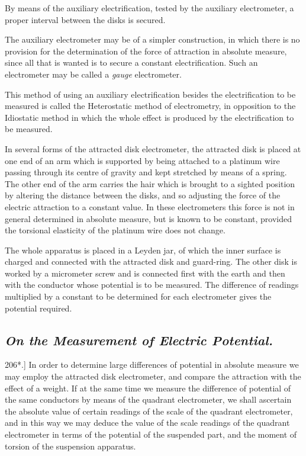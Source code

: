 \documentclass[12pt,oneside]{book}[2021/10/04]
\newcommand{\Heading}{\centering\normalfont}
\newcommand{\Subsection}[1]{\subsection*{\normalsize\Heading\itshape #1}}
\newcommand{\Runhead}[1]{\fancyhead[C]{\iffloatpage{}{\small#1}}}
\newcommand{\article}[1]{\phantomsection \label{art:#1}{#1.]}}
\newcommand{\¬}{\hphantom{0}}
\begin{document}
By means of the auxiliary electrification, tested by the auxiliary
electrometer, a proper interval between the disks is secured.

The auxiliary electrometer may be of a simpler construction, in
which there is no provision for the determination of the force
of attraction in absolute measure, since all that is wanted is to
secure a constant electrification. Such an electrometer may be
called a \textit{gauge} electrometer.

This method of using an auxiliary electrification besides the electrification
to be measured is called the Heterostatic method of
electrometry, in opposition to the Idiostatic method in which the
whole effect is produced by the electrification to be measured.

In several forms of the attracted disk electrometer, the attracted
disk is placed at one end of an arm which is supported by being
attached to a platinum wire passing through its centre of gravity
and kept stretched by means of a spring. The other end of the
arm carries the hair which is brought to a sighted position by
altering the distance between the disks, and so adjusting the force
of the electric attraction to a constant value. In these electrometers
this force is not in general determined in absolute measure,
but is known to be constant, provided the torsional elasticity of
the platinum wire does not change.

The whole apparatus is placed in a Leyden jar, of which the inner
surface is charged and connected with the attracted disk and
guard-ring. The other disk is worked by a micrometer screw and
is connected first with the earth and then with the conductor whose
potential is to be measured. The difference of readings multiplied
by a constant to be determined for each electrometer gives the
potential required.

\Subsection{On the Measurement of Electric Potential.}

\article{206*} In order to determine large differences of potential in absolute
measure we may employ the attracted disk electrometer, and
compare the attraction with the effect of a weight. If at the same
time we measure the difference of potential of the same conductors
by means of the quadrant electrometer, we shall ascertain the
absolute value of certain readings of the scale of the quadrant
electrometer, and in this way we may deduce the value of the scale
readings of the quadrant electrometer in terms of the potential
of the suspended part, and the moment of torsion of the suspension
apparatus.
\Runhead{MEASUREMENT OF POTENTIAL.}
\end{document}
